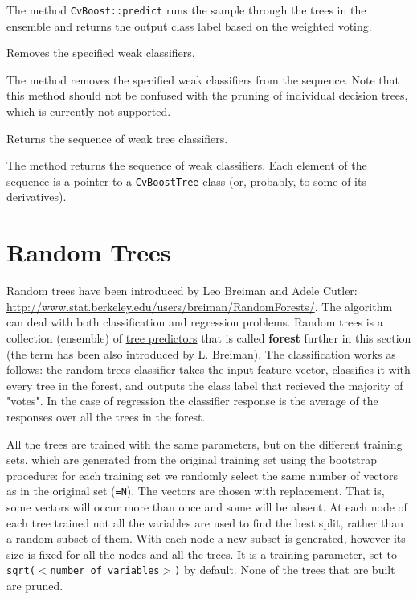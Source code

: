 The method \texttt{CvBoost::predict} runs the sample through the trees in the ensemble and returns the output class label based on the weighted voting.



Removes the specified weak classifiers.


The method removes the specified weak classifiers from the sequence. Note that this method should not be confused with the pruning of individual decision trees, which is currently not supported.



Returns the sequence of weak tree classifiers.


The method returns the sequence of weak classifiers. Each element of the sequence is a pointer to a \texttt{CvBoostTree} class (or, probably, to some of its derivatives).

\section{Random Trees}


Random trees have been introduced by Leo Breiman and Adele Cutler: \url{http://www.stat.berkeley.edu/users/breiman/RandomForests/}. The algorithm can deal with both classification and regression problems. Random trees is a collection (ensemble) of \href{#DecisionTrees}{tree predictors} that is called \textbf{forest} further in this section (the term has been also introduced by L. Breiman). The classification works as follows: the random trees classifier takes the input feature vector, classifies it with every tree in the forest, and outputs the class label that recieved the majority of "votes". In the case of regression the classifier response is the average of the responses over all the trees in the forest.

All the trees are trained with the same parameters, but on the different training sets, which are generated from the original training set using the bootstrap procedure: for each training set we randomly select the same number of vectors as in the original set (\texttt{=N}). The vectors are chosen with replacement. That is, some vectors will occur more than once and some will be absent. At each node of each tree trained not all the variables are used to find the best split, rather than a random subset of them. With each node a new subset is generated, however its size is fixed for all the nodes and all the trees. It is a training parameter, set to \texttt{sqrt($<$number\_of\_variables$>$)} by default. None of the trees that are built are pruned.


